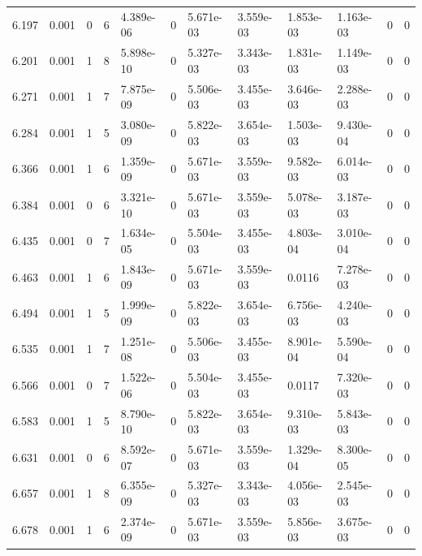 \documentclass[preview]{standalone}
\begin{document}
{{{{{\begin{tabular}{L{1.2cm}C{1.2cm} C{0.3cm}C{0.5cm} C{1.4cm}C{1.4cm} C{1.4cm}C{1.4cm} C{1.6cm}C{1.6cm} C{1.6cm}C{1.6cm}}
  6.197  &  0.001  & 0     &  6 &  4.389e-06  & 0  &  5.671e-03&   3.559e-03& 1.853e-03 & 1.163e-03   &  0 & 0  \\ 
  6.201  &  0.001  & 1     &  8 &  5.898e-10  & 0  &  5.327e-03&   3.343e-03& 1.831e-03 & 1.149e-03   &  0 & 0  \\ 
  6.271  &  0.001  & 1     &  7 &  7.875e-09  & 0  &  5.506e-03&   3.455e-03& 3.646e-03 & 2.288e-03   &  0 & 0  \\ 
  6.284  &  0.001  & 1     &  5 &  3.080e-09  & 0  &  5.822e-03&   3.654e-03& 1.503e-03 & 9.430e-04   &  0 & 0  \\ 
  6.366  &  0.001  & 1     &  6 &  1.359e-09  & 0  &  5.671e-03&   3.559e-03& 9.582e-03 & 6.014e-03   &  0 & 0  \\ 
  6.384  &  0.001  & 0     &  6 &  3.321e-10  & 0  &  5.671e-03&   3.559e-03& 5.078e-03 & 3.187e-03   &  0 & 0  \\ 
  6.435  &  0.001  & 0     &  7 &  1.634e-05  & 0  &  5.504e-03&   3.455e-03& 4.803e-04 & 3.010e-04   &  0 & 0  \\ 
  6.463  &  0.001  & 1     &  6 &  1.843e-09  & 0  &  5.671e-03&   3.559e-03& 0.0116 & 7.278e-03   &  0 & 0  \\ 
  6.494  &  0.001  & 1     &  5 &  1.999e-09  & 0  &  5.822e-03&   3.654e-03& 6.756e-03 & 4.240e-03   &  0 & 0  \\ 
  6.535  &  0.001  & 1     &  7 &  1.251e-08  & 0  &  5.506e-03&   3.455e-03& 8.901e-04 & 5.590e-04   &  0 & 0  \\ 
  6.566  &  0.001  & 0     &  7 &  1.522e-06  & 0  &  5.504e-03&   3.455e-03& 0.0117 & 7.320e-03   &  0 & 0  \\ 
  6.583  &  0.001  & 1     &  5 &  8.790e-10  & 0  &  5.822e-03&   3.654e-03& 9.310e-03 & 5.843e-03   &  0 & 0  \\ 
  6.631  &  0.001  & 0     &  6 &  8.592e-07  & 0  &  5.671e-03&   3.559e-03& 1.329e-04 & 8.300e-05   &  0 & 0  \\ 
  6.657  &  0.001  & 1     &  8 &  6.355e-09  & 0  &  5.327e-03&   3.343e-03& 4.056e-03 & 2.545e-03   &  0 & 0  \\ 
  6.678  &  0.001  & 1     &  6 &  2.374e-09  & 0  &  5.671e-03&   3.559e-03& 5.856e-03 & 3.675e-03   &  0 & 0  \\ 
\hline 
\end{tabular} 

}}}}}
\end{document}
